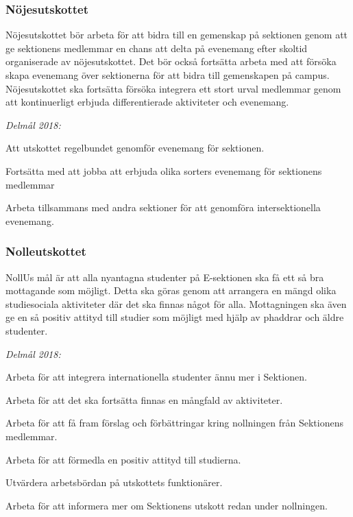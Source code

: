 \documentclass[../_main/handlingar.tex]{subfiles}
\begin{document}
\subsubsection*{Nöjesutskottet}
Nöjesutskottet bör arbeta för att bidra till en gemenskap på sektionen genom att ge sektionens medlemmar en chans att delta på evenemang efter skoltid organiserade av nöjesutskottet. Det bör också fortsätta arbeta med att försöka skapa evenemang över sektionerna för att bidra till gemenskapen på campus. Nöjesutskottet ska fortsätta försöka integrera ett stort urval medlemmar genom att kontinuerligt erbjuda differentierade aktiviteter och evenemang.

\emph{Delmål 2018:}
\begin{dashlist}
    \item Att utskottet regelbundet genomför evenemang för sektionen. 
    \item Fortsätta med att jobba att erbjuda olika sorters evenemang för sektionens medlemmar
    \item Arbeta tillsammans med andra sektioner för att genomföra intersektionella evenemang. 
\end{dashlist}

\newpage

\subsubsection*{Nolleutskottet}
NollUs mål är att alla nyantagna studenter på E-sektionen ska få ett så bra mottagande som möjligt. Detta ska göras genom att arrangera en mängd olika studiesociala aktiviteter där det ska finnas något för alla. Mottagningen ska även ge en så positiv attityd till studier som möjligt med hjälp av phaddrar och äldre studenter.

\emph{Delmål 2018:}
\begin{dashlist}
    \item Arbeta för att integrera internationella studenter ännu mer i Sektionen.
    \item Arbeta för att det ska fortsätta finnas en mångfald av aktiviteter.
    \item Arbeta för att få fram förslag och förbättringar kring nollningen från Sektionens medlemmar.
    \item Arbeta för att förmedla en positiv attityd till studierna.
    \item Utvärdera arbetsbördan på utskottets funktionärer.
    \item Arbeta för att informera mer om Sektionens utskott redan under nollningen.        
\end{dashlist}
\end{document}
